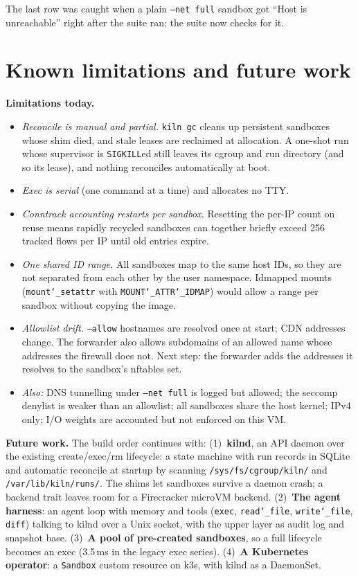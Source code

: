 \documentclass[10pt,letterpaper]{article}
\newcommand{\code}[1]{\texttt{#1}}
\newcommand{\us}{\char`\_}
\begin{document}
The last row was caught when a plain \code{--net full} sandbox got ``Host is
unreachable'' right after the suite ran; the suite now checks for it.

\section{Known limitations and future work}
\label{sec:limits}\label{sec:future}

\textbf{Limitations today.}
\begin{itemize}
\item \emph{Reconcile is manual and partial.} \code{kiln gc} cleans up persistent
sandboxes whose shim died, and stale leases are reclaimed at allocation. A
one-shot run whose supervisor is \code{SIGKILL}ed still leaves its cgroup and run
directory (and so its lease), and nothing reconciles automatically at boot.
\item \emph{Exec is serial} (one command at a time) and allocates no TTY.
\item \emph{Conntrack accounting restarts per sandbox.} Resetting the per-IP count
on reuse means rapidly recycled sandboxes can together briefly exceed 256
tracked flows per IP until old entries expire.
\item \emph{One shared ID range.} All sandboxes map to the same host IDs, so
they are not separated from each other by the user namespace. Idmapped mounts
(\code{mount\us{}setattr} with \code{MOUNT\us{}ATTR\us{}IDMAP}) would allow a range per
sandbox without copying the image.
\item \emph{Allowlist drift.} \code{--allow} hostnames are resolved once at start;
CDN addresses change. The forwarder also allows subdomains of an allowed name
whose addresses the firewall does not. Next step: the forwarder adds the
addresses it resolves to the sandbox's nftables set.
\item \emph{Also:} DNS tunnelling under \code{--net full} is logged but allowed;
the seccomp denylist is weaker than an allowlist; all sandboxes share the host
kernel; IPv4 only; I/O weights are accounted but not enforced on this VM.
\end{itemize}

\textbf{Future work.} The build order continues with:
(1)~\textbf{kilnd}, an API daemon over the existing create/exec/rm lifecycle:
a state machine with run records in SQLite and automatic reconcile at startup by
scanning \code{/sys/fs/cgroup/kiln/} and \code{/var/lib/kiln/runs/}. The
shims let sandboxes survive a daemon crash; a backend trait leaves room for a
Firecracker microVM backend.
(2)~\textbf{The agent harness}: an agent loop with memory and tools
(\code{exec}, \code{read\us{}file}, \code{write\us{}file}, \code{diff}) talking to
kilnd over a Unix socket, with the upper layer as audit log and snapshot base.
(3)~\textbf{A pool of pre-created sandboxes}, so a full lifecycle becomes an
exec (3.5\,ms in the legacy exec series). (4)~\textbf{A Kubernetes operator}: a
\code{Sandbox} custom resource on k3s, with kilnd as a DaemonSet.
\end{document}
